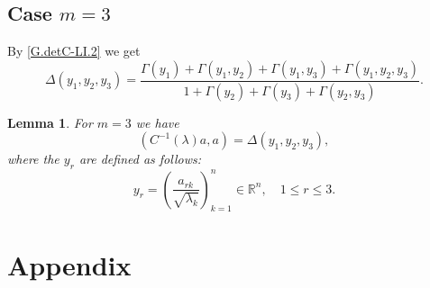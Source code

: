 \documentclass[preprint,12pt]{elsarticle}
\newtheorem{lem}[thm]{Lemma}
\numberwithin{equation}{section}
\begin{document}
\subsection{Case $m=3$}
By \eqref{G.detC-LI.2} we get
$$
\Delta(y_1,y_2,y_3)=\frac{\Gamma(y_1)+\Gamma(y_1,y_2)+\Gamma(y_1,y_3)+\Gamma(y_1,y_2,y_3)}{1+\Gamma(y_2)+\Gamma(y_3)+\Gamma(y_2,y_3)}.
$$
\begin{lem}
\label{l.m=3}
For $m=3$ we have
\begin{equation}
\label{m=3}
(C^{-1}(\lambda)a,a)=\Delta(y_1,y_2,y_3),
\end{equation}
where the $y_r$ are defined as follows:
\begin{equation}
\label{f,g,h=} 
y_r=
\left(\frac{a_{rk}}{\sqrt{\lambda_k}}\right)_{k=1}^n\in \mathbb R^n,\quad 1\leq r\leq 3.
\end{equation} 
\end{lem}
%
\section{Appendix}
\end{document}

